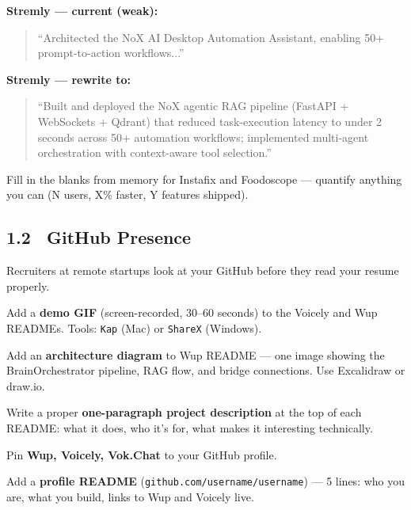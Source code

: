 \documentclass[11pt, a4paper]{article}
\DeclareRobustCommand{\badge}[2]{%
  \tikz[baseline=(n.base)]{
    \node[inner sep=3pt, rounded corners=3pt,
          fill=#1!15, text=#1!70!black,
          font=\fontsize{8}{8}\selectfont\bfseries] (n) {#2};
  }%
}
\DeclareRobustCommand{\high}{\badge{warning}{HIGH}}
\begin{document}
\vspace{6pt}

\noindent\textbf{Stremly — current (weak):}
\begin{quote}
\color{danger}\small ``Architected the NoX AI Desktop Automation Assistant, enabling 50+ prompt-to-action workflows...''
\end{quote}

\noindent\textbf{Stremly — rewrite to:}
\begin{quote}
\color{success}\small ``Built and deployed the NoX agentic RAG pipeline (FastAPI + WebSockets + Qdrant) that reduced task-execution latency to under 2 seconds across 50+ automation workflows; implemented multi-agent orchestration with context-aware tool selection.''
\end{quote}

\vspace{6pt}
\noindent Fill in the blanks from memory for Instafix and Foodoscope — quantify anything you can (N users, X\% faster, Y features shipped).

\subsection{1.2 \ GitHub Presence \hfill \high}

Recruiters at remote startups look at your GitHub before they read your resume properly.

\begin{checklist}
  \item Add a \textbf{demo GIF} (screen-recorded, 30–60 seconds) to the Voicely and Wup READMEs. Tools: \texttt{Kap} (Mac) or \texttt{ShareX} (Windows).
  \item Add an \textbf{architecture diagram} to Wup README — one image showing the BrainOrchestrator pipeline, RAG flow, and bridge connections. Use Excalidraw or draw.io.
  \item Write a proper \textbf{one-paragraph project description} at the top of each README: what it does, who it's for, what makes it interesting technically.
  \item Pin \textbf{Wup, Voicely, Vok.Chat} to your GitHub profile.
  \item Add a \textbf{profile README} (\texttt{github.com/username/username}) — 5 lines: who you are, what you build, links to Wup and Voicely live.
\end{checklist}
\end{document}
